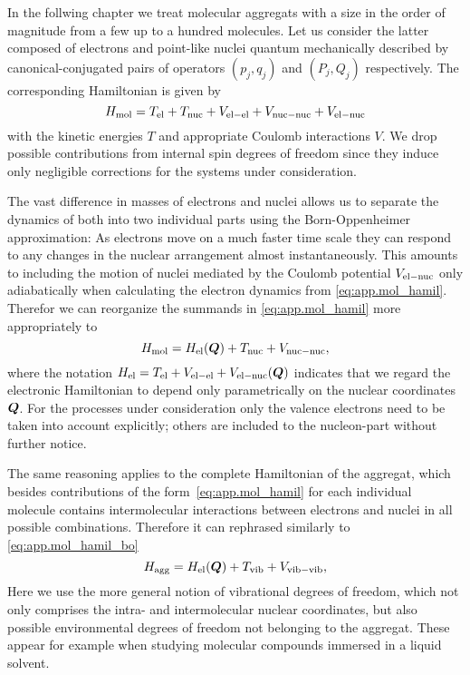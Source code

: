 In the follwing chapter we treat molecular aggregats with a size in the order of magnitude from a few up to a hundred molecules.
Let us consider the latter composed of electrons and point-like nuclei quantum mechanically described by canonical-conjugated pairs of operators $(p_j, q_j)$ and $(P_j, Q_j)$ respectively.
The corresponding Hamiltonian is given by
\begin{equation}
  H_\mathrm{mol} = T_\mathrm{el} + T_\mathrm{nuc} + V_\mathrm{el-el} + V_\mathrm{nuc-nuc} + V_\mathrm{el-nuc}
  \label{eq:app.mol_hamil}
\end{equation}
with the kinetic energies $T$ and appropriate Coulomb interactions $V$.
We drop possible contributions from internal spin degrees of freedom since they induce only negligible corrections for the systems under consideration.

The vast difference in masses of electrons and nuclei allows us to separate the dynamics of both into two individual parts using the Born-Oppenheimer approximation:
As electrons move on a much faster time scale they can respond to any changes in the nuclear arrangement almost instantaneously.
This amounts to including the motion of nuclei mediated by the Coulomb potential $V_\mathrm{el-nuc}$ only adiabatically when calculating the electron dynamics from \autoref{eq:app.mol_hamil}.
Therefor we can reorganize the summands in \autoref{eq:app.mol_hamil} more appropriately to
\begin{equation}
  H_\mathrm{mol} = H_\mathrm{el}(\boldsymbol{Q}) + T_\mathrm{nuc} + V_\mathrm{nuc-nuc},
  \label{eq:app.mol_hamil_bo}
\end{equation}
where the notation $H_\mathrm{el} = T_\mathrm{el} + V_\mathrm{el-el} + V_\mathrm{el-nuc}(\boldsymbol{Q})$ indicates that we regard the electronic Hamiltonian to depend only parametrically on the nuclear coordinates $\boldsymbol{Q}$.
For the processes under consideration only the valence electrons need to be taken into account explicitly; others are included to the nucleon-part without further notice.


The same reasoning applies to the complete Hamiltonian of the aggregat, which besides contributions of the form~\ref{eq:app.mol_hamil} for each individual molecule contains intermolecular interactions between electrons and nuclei in all possible combinations.
Therefore it can rephrased similarly to \autoref{eq:app.mol_hamil_bo}
\begin{equation}
  H_\mathrm{agg} = H_\mathrm{el}(\boldsymbol{Q}) + T_\mathrm{vib} + V_\mathrm{vib-vib},
  \label{eq:app.agg_hamil}
\end{equation}
Here we use the more general notion of vibrational degrees of freedom, which not only comprises the intra- and intermolecular nuclear coordinates, but also possible environmental degrees of freedom not belonging to the aggregat.
These appear for example when studying molecular compounds immersed in a liquid solvent.

